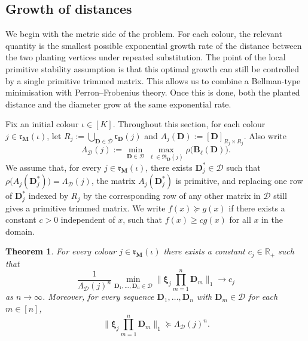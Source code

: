 \documentclass[12pt]{iopart}
\newtheorem{theorem}{Theorem}[section]
\newcommand*{\bbbxi}{\boldsymbol{\xi}}
\begin{document}
\subsection{Growth of distances}

We begin with the metric side of the problem.
For each colour, the relevant quantity is the smallest possible exponential growth rate of the distance between the two planting vertices under repeated substitution.
The point of the local primitive stability assumption is that this optimal growth can still be controlled by a single primitive trimmed matrix.
This allows us to combine a Bellman-type minimisation with Perron--Frobenius theory.
Once this is done, both the planted distance and the diameter grow at the same exponential rate.

Fix an initial colour $\iota\in[K]$.
Throughout this section, for each colour $j\in\mathfrak r_{\mathbf M}(\iota)$, let
$R_j:=\bigcup_{\mathbf D\in\mathcal D}\mathfrak r_{\mathbf D}(j)$ and
$A_j(\mathbf D):=[\mathbf D]_{R_j\times R_j}$.
Also write
\[
\Lambda_{\mathcal D}(j)
:=
\min_{\mathbf D\in\mathcal D}
\max_{\ell\in\mathfrak R_{\mathbf D}(j)}
\rho\big(\mathbf B_\ell(\mathbf D)\big).
\]
We assume that, for every $j\in\mathfrak r_{\mathbf M}(\iota)$, there exists
$\mathbf D_j^*\in\mathcal D$ such that
$\rho\big(A_j(\mathbf D_j^*)\big)=\Lambda_{\mathcal D}(j)$, the matrix
$A_j(\mathbf D_j^*)$ is primitive, and replacing one row of $\mathbf D_j^*$ indexed by $R_j$
by the corresponding row of any other matrix in $\mathcal D$ still gives a primitive trimmed matrix.
We write $f(x) \succeq g(x)$ if there exists a constant $c>0$ independent of $x$, such that $f(x) \geq { c} g(x)$ for all $x$ in the domain.

\begin{theorem}\label{theorem:distance}
For every colour $j\in\mathfrak r_{\mathbf M}(\iota)$ there exists a constant $c_j\in\mathbb R_+$ such that
\[
\frac{1}{\Lambda_{\mathcal D}(j)^n}
\min_{\mathbf D_1,\ldots,\mathbf D_n\in\mathcal D}
\bigg\|
\bbbxi_j\prod_{m=1}^n \mathbf D_m
\bigg\|_1
\to c_j
\]
as $n\to\infty$.
Moreover, for every sequence $\mathbf D_1,\ldots,\mathbf D_n$ with $\mathbf D_m\in\mathcal D$ for each $m\in[n]$,
\[
\bigg\|
\bbbxi_j\prod_{m=1}^n \mathbf D_m
\bigg\|_1
\succeq
\Lambda_{\mathcal D}(j)^n.
\]
\end{theorem}
\end{document}
